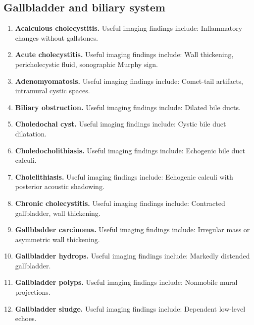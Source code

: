 \subsection{Gallbladder and biliary system}
\begin{enumerate}[leftmargin=*,itemsep=0.45em,topsep=0.4em]
\item \textbf{Acalculous cholecystitis.} Useful imaging findings include: Inflammatory changes without gallstones.
\item \textbf{Acute cholecystitis.} Useful imaging findings include: Wall thickening, pericholecystic fluid, sonographic Murphy sign.
\item \textbf{Adenomyomatosis.} Useful imaging findings include: Comet-tail artifacts, intramural cystic spaces.
\item \textbf{Biliary obstruction.} Useful imaging findings include: Dilated bile ducts.
\item \textbf{Choledochal cyst.} Useful imaging findings include: Cystic bile duct dilatation.
\item \textbf{Choledocholithiasis.} Useful imaging findings include: Echogenic bile duct calculi.
\item \textbf{Cholelithiasis.} Useful imaging findings include: Echogenic calculi with posterior acoustic shadowing.
\item \textbf{Chronic cholecystitis.} Useful imaging findings include: Contracted gallbladder, wall thickening.
\item \textbf{Gallbladder carcinoma.} Useful imaging findings include: Irregular mass or asymmetric wall thickening.
\item \textbf{Gallbladder hydrops.} Useful imaging findings include: Markedly distended gallbladder.
\item \textbf{Gallbladder polyps.} Useful imaging findings include: Nonmobile mural projections.
\item \textbf{Gallbladder sludge.} Useful imaging findings include: Dependent low-level echoes.
\end{enumerate}

